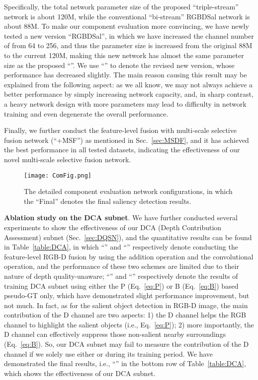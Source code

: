 \documentclass[journal]{IEEEtran}
\begin{document}
Specifically, the total network parameter size of the proposed ``triple-stream'' network is about 120M, while the conventional ``bi-stream'' RGBDSal network is about 88M.
To make our component evaluation more convincing, we have newly tested a new version ``RGBDSal'', in which we have increased the channel number of  from 64 to 256, and thus the parameter size is increased from the original 88M to the current 120M, making this new network has almost the same parameter size as the proposed ``''.
We use ``'' to denote the revised new version, whose performance has decreased slightly.
The main reason causing this result may be explained from the following aspect: as we all know, we may not always achieve a better performance by simply increasing network capacity, and, in sharp contrast, a heavy network design with more parameters may lead to difficulty in network training and even degenerate the overall performance.

Finally, we further conduct the feature-level fusion with multi-scale selective fusion network (``+MSF'') as mentioned in Sec.~\ref{sec:MSDF}, and it has achieved the best performance in all tested datasets, indicating the effectiveness of our novel multi-scale selective fusion network.

\begin{figure*}\begin{center}
\texttt{[image: ComFig.png]}
\end{center}
   \caption{The detailed component evaluation network configurations, in which the ``Final'' denotes the final saliency detection results.}
\label{fig:ComFig}
\end{figure*}

\textbf{Ablation study on the DCA subnet}.
We have further conducted several experiments to show the effectiveness of our DCA (Depth Contribution Assessment) subnet (Sec.~\ref{sec:DQSN}), and the quantitative results can be found in Table~\ref{table:DCA}, in which ``'' and ``'' respectively denote conducting the feature-level RGB-D fusion by using the addition operation and the  convolutional operation, and the performance of these two schemes are limited due to their nature of depth quality-unaware;
``'' and ``'' respectively denote the results of training DCA subnet using either the P (Eq.~\ref{eq:P}) or B (Eq.~\ref{eq:B}) based pseudo-GT only, which have demonstrated slight performance improvement, but not much.
In fact, as for the salient object detection in RGB-D image, the main contribution of the D channel are two aspects: 1) the D channel helps the RGB channel to highlight the salient objects (i.e., Eq.~\ref{eq:P}); 2) more importantly, the D channel can effectively suppress those non-salient nearby surroundings (Eq.~\ref{eq:B}).
So, our DCA subnet may fail to measure the contribution of the D channel if we solely use either  or  during its training period.
We have demonstrated the final results, i.e., ``'' in the bottom row of Table~\ref{table:DCA}, which shows the effectiveness of our DCA subnet.
\end{document}

